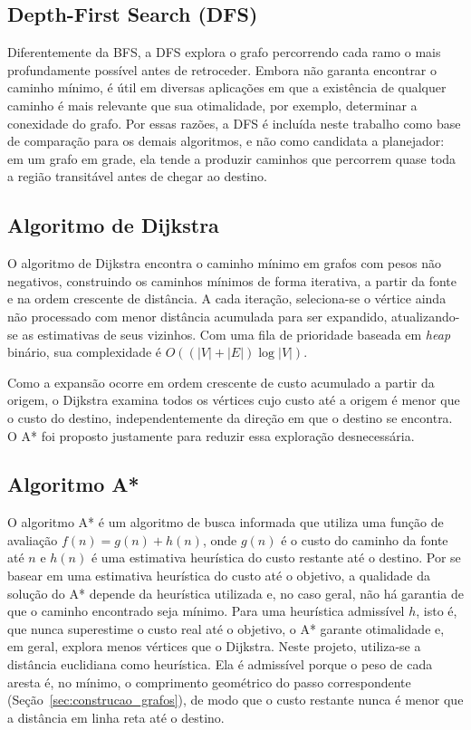 \documentclass[
    12pt,
    openright,
    oneside,
    a4paper,
    english,
    brazil
]{abntex2}
\begin{document}
\subsection{Depth-First Search (DFS)}

Diferentemente da BFS, a DFS \cite{cormen2009} explora o grafo percorrendo cada ramo o mais profundamente possível antes de retroceder. Embora não garanta encontrar o caminho mínimo, é útil em diversas aplicações em que a existência de qualquer caminho é mais relevante que sua otimalidade, por exemplo, determinar a conexidade do grafo. Por essas razões, a DFS é incluída neste trabalho como base de comparação para os demais algoritmos, e não como candidata a planejador: em um grafo em grade, ela tende a produzir caminhos que percorrem quase toda a região transitável antes de chegar ao destino.

\subsection{Algoritmo de Dijkstra}

O algoritmo de Dijkstra \cite{dijkstra1959} encontra o caminho mínimo em grafos com pesos não negativos, construindo os caminhos mínimos de forma iterativa, a partir da fonte e na ordem crescente de distância. A cada iteração, seleciona-se o vértice ainda não processado com menor distância acumulada para ser expandido, atualizando-se as estimativas de seus vizinhos. Com uma fila de prioridade baseada em \textit{heap} binário, sua complexidade é $O((|V| + |E|) \log |V|)$.

Como a expansão ocorre em ordem crescente de custo acumulado a partir da origem, o Dijkstra examina todos os vértices cujo custo até a origem é menor que o custo do destino, independentemente da direção em que o destino se encontra. O A* foi proposto justamente para reduzir essa exploração desnecessária.

\subsection{Algoritmo A*}

O algoritmo A* \cite{hart1968} é um algoritmo de busca informada que utiliza uma função de avaliação $f(n) = g(n) + h(n)$, onde $g(n)$ é o custo do caminho da fonte até $n$ e $h(n)$ é uma estimativa heurística do custo restante até o destino. Por se basear em uma estimativa heurística do custo até o objetivo, a qualidade da solução do A* depende da heurística utilizada e, no caso geral, não há garantia de que o caminho encontrado seja mínimo. Para uma heurística admissível $h$, isto é, que nunca superestime o custo real até o objetivo, o A* garante otimalidade e, em geral, explora menos vértices que o Dijkstra. Neste projeto, utiliza-se a distância euclidiana como heurística. Ela é admissível porque o peso de cada aresta é, no mínimo, o comprimento geométrico do passo correspondente (Seção~\ref{sec:construcao_grafos}), de modo que o custo restante nunca é menor que a distância em linha reta até o destino.
\end{document}
